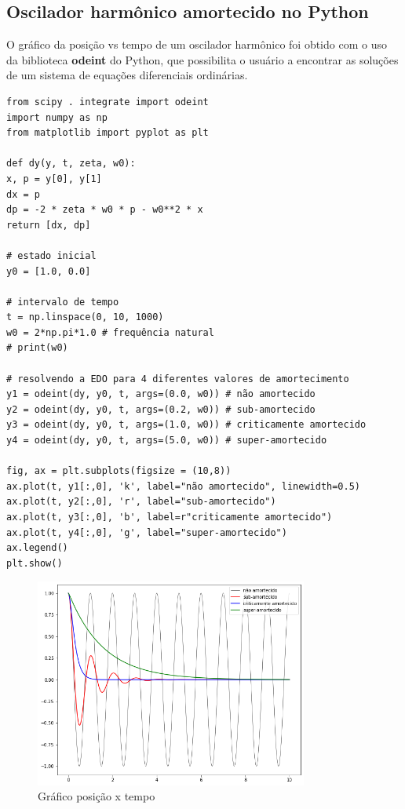 \subsection{Oscilador harmônico amortecido no Python}

O gráfico da posição vs tempo de um oscilador harmônico foi obtido com o uso da biblioteca \textbf{odeint} do Python, que possibilita o usuário a encontrar as soluções de um sistema de equações diferenciais ordinárias.

\begin{verbatim}
from scipy . integrate import odeint
import numpy as np
from matplotlib import pyplot as plt

def dy(y, t, zeta, w0):
x, p = y[0], y[1]
dx = p
dp = -2 * zeta * w0 * p - w0**2 * x
return [dx, dp]

# estado inicial
y0 = [1.0, 0.0]

# intervalo de tempo
t = np.linspace(0, 10, 1000)
w0 = 2*np.pi*1.0 # frequência natural
# print(w0)

# resolvendo a EDO para 4 diferentes valores de amortecimento
y1 = odeint(dy, y0, t, args=(0.0, w0)) # não amortecido
y2 = odeint(dy, y0, t, args=(0.2, w0)) # sub-amortecido
y3 = odeint(dy, y0, t, args=(1.0, w0)) # criticamente amortecido
y4 = odeint(dy, y0, t, args=(5.0, w0)) # super-amortecido

fig, ax = plt.subplots(figsize = (10,8))
ax.plot(t, y1[:,0], 'k', label="não amortecido", linewidth=0.5)
ax.plot(t, y2[:,0], 'r', label="sub-amortecido")
ax.plot(t, y3[:,0], 'b', label=r"criticamente amortecido")
ax.plot(t, y4[:,0], 'g', label="super-amortecido")
ax.legend()
plt.show()
\end{verbatim}

\begin{figure}[H]
	\centering
	\includegraphics[width=0.8\textwidth]{./Imagens/Oscilador/OH2.png} 
	\caption{Gráfico posição x tempo}
	\label{fig:OH2}
\end{figure}

